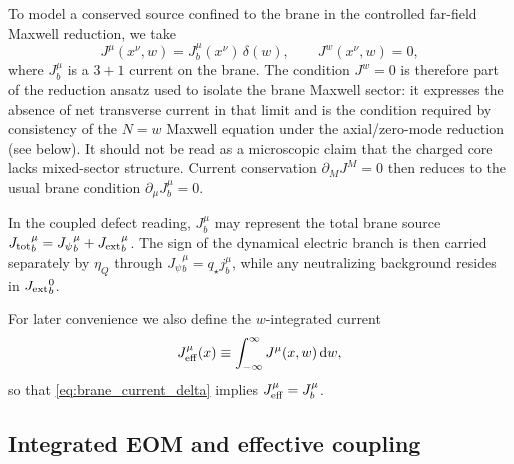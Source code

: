 \documentclass[11pt]{article}
\newcommand{\dd}{\mathrm d}
\newcommand{\J}{J}
\newcommand{\etaQ}{\eta_Q}
\newcommand{\qstar}{q_\star}
\newcommand{\Jpsi}{J_\psi}
\newcommand{\Jext}{J_{\rm ext}}
\newcommand{\Jtot}{J_{\rm tot}}
\begin{document}
To model a conserved source confined to the brane in the controlled far-field
Maxwell reduction, we take
\begin{equation}
  \J^\mu(x^\nu,w) = \J_b^\mu(x^\nu)\,\delta(w),
  \qquad
  \J^w(x^\nu,w)=0,
  \label{eq:brane_current_delta}
\end{equation}
where \(\J_b^\mu\) is a \(3+1\) current on the brane. The condition \(\J^w=0\) is
therefore part of the reduction ansatz used to isolate the brane Maxwell sector:
it expresses the absence of net transverse current in that limit and is the
condition required by consistency of the \(N=w\) Maxwell equation under the
axial/zero-mode reduction (see below). It should not be read as a microscopic
claim that the charged core lacks mixed-sector structure. Current conservation
\(\partial_M\J^M=0\) then reduces to the usual brane condition
\(\partial_\mu \J_b^\mu=0\).

In the coupled defect reading, \(\J_b^\mu\) may represent the total brane source
\(\Jtot{}_b^\mu=\Jpsi{}_b^\mu+\Jext{}_b^\mu\). The sign of the dynamical electric
branch is then carried separately by \(\etaQ\) through
\(\Jpsi{}_b^\mu=\qstar j_b^\mu\), while any neutralizing background resides in
\(\Jext{}_b^0\).

For later convenience we also define the \(w\)-integrated current
\begin{equation}
  \J_{\rm eff}^\mu(x) \equiv \int_{-\infty}^{\infty}\J^\mu(x,w)\,\dd w,
\end{equation}
so that \cref{eq:brane_current_delta} implies \(\J_{\rm eff}^\mu=\J_b^\mu\).

\subsection{Integrated EOM and effective coupling}
\label{sec:mu_eff}
\end{document}
